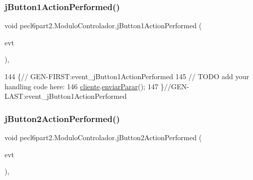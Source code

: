 \subsubsection{\texorpdfstring{j\+Button1\+Action\+Performed()}{jButton1ActionPerformed()}}
{\footnotesize\ttfamily void pecl6part2.\+Modulo\+Controlador.\+j\+Button1\+Action\+Performed (\begin{DoxyParamCaption}\item[{java.\+awt.\+event.\+Action\+Event}]{evt }\end{DoxyParamCaption})\hspace{0.3cm}{\ttfamily [inline]}, {\ttfamily [private]}}


\begin{DoxyCode}
144                                                                          \{\textcolor{comment}{//
      GEN-FIRST:event\_jButton1ActionPerformed}
145         \textcolor{comment}{// TODO add your handling code here:}
146         \mbox{\hyperlink{classpecl6part2_1_1_modulo_controlador_a62308c2ac095ab8b16d1478b2577891e}{cliente}}.\mbox{\hyperlink{classpecl6part2_1_1_cliente_controlador_ab228718d193754ecf65492b86d5be0d4}{enviarParar}}();
147     \}\textcolor{comment}{//GEN-LAST:event\_jButton1ActionPerformed}
\end{DoxyCode}
\mbox{\label{classpecl6part2_1_1_modulo_controlador_a7090e14e8838ee683046e423ff4f9945}} 
\subsubsection{\texorpdfstring{j\+Button2\+Action\+Performed()}{jButton2ActionPerformed()}}
{\footnotesize\ttfamily void pecl6part2.\+Modulo\+Controlador.\+j\+Button2\+Action\+Performed (\begin{DoxyParamCaption}\item[{java.\+awt.\+event.\+Action\+Event}]{evt }\end{DoxyParamCaption})\hspace{0.3cm}{\ttfamily [inline]}, {\ttfamily [private]}}


